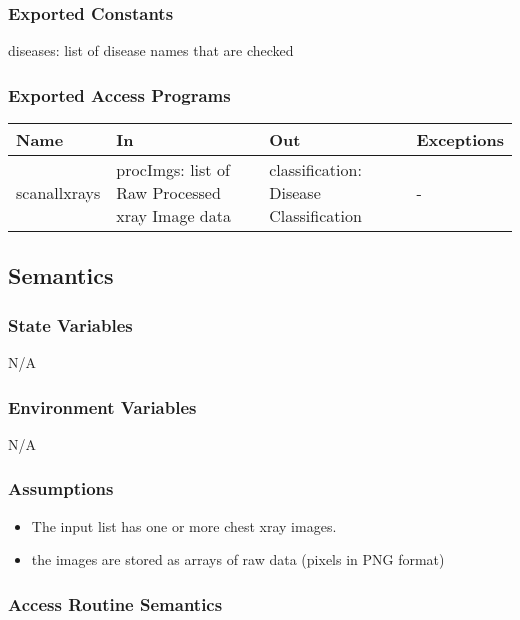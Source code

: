\documentclass[12pt, titlepage]{article}
\begin{document}
\subsubsection{Exported Constants}
diseases: list of disease names that are checked

\subsubsection{Exported Access Programs}

\begin{center}
  \begin{tabular}{p{3cm} p{4cm} p{4cm} p{3cm}}
    \hline
    \textbf{Name} & \textbf{In} & \textbf{Out} & \textbf{Exceptions} \\
    \hline
    scanallxrays & procImgs: list of Raw Processed xray Image data & classification: Disease
      Classification & - \\
    \hline
  \end{tabular}
\end{center}

\subsection{Semantics}

\subsubsection{State Variables}
N/A

\subsubsection{Environment Variables}
N/A

\subsubsection{Assumptions}
\begin{itemize}
      \item The input list has one or more chest xray images.
      \item the images are stored as arrays of raw data (pixels in PNG format)
\end{itemize}

\subsubsection{Access Routine Semantics}
\end{document}
